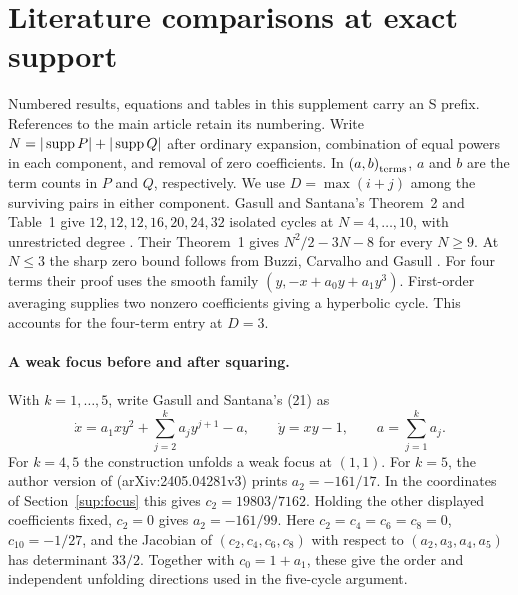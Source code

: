 \section{Literature comparisons at exact support}\label{sup:sources}
Numbered results, equations and tables in this supplement carry an S prefix. References to the main article retain its numbering. Write \(N=|\operatorname{supp} P|+|\operatorname{supp} Q|\) after ordinary expansion, combination of equal powers in each component, and removal of zero coefficients. In \(\left(a,b\right)_{\mathrm{terms}}\), \(a\) and \(b\) are the term counts in \(P\) and \(Q\), respectively. We use \(D=\max(i+j)\) among the surviving pairs in either component. Gasull and Santana's Theorem~2 and Table~1 give \(12,12,12,16,20,24,32\) isolated cycles at \(N=4,\ldots,10\), with unrestricted degree \cite[Theorem~2 and Table~1]{GasullSantana2024}. Their Theorem~1 gives \(N^2/2-3N-8\) for every \(N\ge9\). At \(N\le3\) the sharp zero bound follows from Buzzi, Carvalho and Gasull \cite{BuzziCarvalhoGasull2021}. For four terms their proof uses the smooth family \((y,-x+a_0y+a_1y^3)\). First-order averaging supplies two nonzero coefficients giving a hyperbolic cycle. This accounts for the four-term entry at \(D=3\).

\paragraph{A weak focus before and after squaring.}
With \(k=1,\ldots,5\), write Gasull and Santana's (21) \cite[pp.~11--12]{GasullSantana2024} as
\[
 \dot x=a_1xy^2+\sum_{j=2}^k a_jy^{j+1}-a,\qquad
 \dot y=xy-1,\qquad a=\sum_{j=1}^k a_j .
\]
For \(k=4,5\) the construction unfolds a weak focus at \((1,1)\). For \(k=5\), the author version of \cite[(21), p.~11]{GasullSantana2024} (arXiv:2405.04281v3) prints \(a_2=-161/17\). In the coordinates of Section~\ref{sup:focus} this gives \(c_2=19803/7162\). Holding the other displayed coefficients fixed, \(c_2=0\) gives \(a_2=-161/99\). Here \(c_2=c_4=c_6=c_8=0\), \(c_{10}=-1/27\), and the Jacobian of \((c_2,c_4,c_6,c_8)\) with respect to \((a_2,a_3,a_4,a_5)\) has determinant \(33/2\). Together with \(c_0=1+a_1\), these give the order and independent unfolding directions used in the five-cycle argument.

